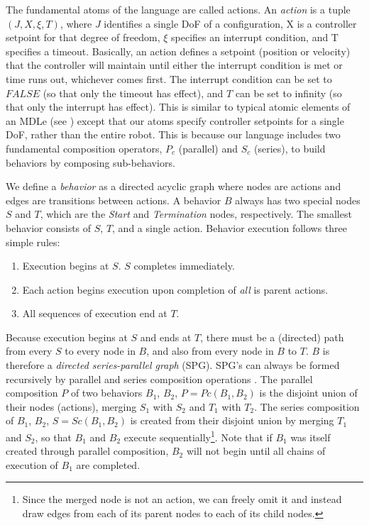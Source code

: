 \documentclass[conference]{IEEEtran}
\theoremstyle{definition}
\begin{document}
The fundamental atoms of the language are called actions.  An \textit{action} is a tuple \(
(J, X, \xi, T)\), where \(J\) identifies a single DoF of a configuration, X is a
controller setpoint for that degree of freedom, \(\xi\) specifies an interrupt
condition, and T specifies a timeout.  Basically, an action defines a setpoint
(position or velocity) that the controller will maintain until either the
interrupt condition is met or time runs out, whichever comes first.  The
interrupt condition can be set to \(FALSE\) (so that only the timeout has effect),
and \(T\) can be set to infinity (so that only the interrupt has effect).  This is
similar to typical atomic elements of an MDLe (see \cite{hristu2003motion}) except that our
atoms specify controller setpoints for a single DoF, rather than the entire
robot.  This is because our language includes two fundamental composition operators,
\(P_c\) (parallel) and \(S_c\) (series), to build behaviors by composing sub-behaviors.

We define a \textit{behavior} as a directed acyclic graph where nodes are actions and
edges are transitions between actions.  A behavior \(B\) always has two
special nodes \(S\) and \(T\), which are the \textit{Start} and \textit{Termination} nodes, respectively.
The smallest behavior consists of \(S\), \(T\), and a single action.  Behavior execution follows three simple rules:

\begin{enumerate}
\item Execution begins at \(S\).  \(S\) completes immediately.
\item Each action begins execution upon completion of \textit{all} is parent actions.
\item All sequences of execution end at \(T\).
\end{enumerate}

Because execution begins at \(S\) and ends at \(T\), there must be a
(directed) path from every \(S\) to every node in \(B\), and also from every node in \(B\)
to \(T\).  \(B\) is therefore a \textit{directed series-parallel graph} (SPG). SPG's
can always be formed recursively by parallel and series composition operations \cite{SPG}. The
parallel composition \(P\) of two behaviors \(B_1\), \(B_2\), \(P = Pc(B_1, B_2)\)
is the disjoint
union of their nodes (actions), merging \(S_1\) with \(S_2\) and \(T_1\) with \(T_2\). The series
composition of \(B_1\), \(B_2\), \(S = Sc(B_1, B_2)\) is created from their disjoint union by
merging \(T_1\) and \(S_2\), so that \(B_1\) and \(B_2\) execute sequentially\footnote{Since
the merged node is not an action, we can freely omit it and instead draw edges
from each of its parent nodes to each of its child nodes.}.  Note that if \(B_1\) was
itself created through parallel composition, \(B_2\) will not begin until all chains
of execution of \(B_1\) are completed.
\end{document}
